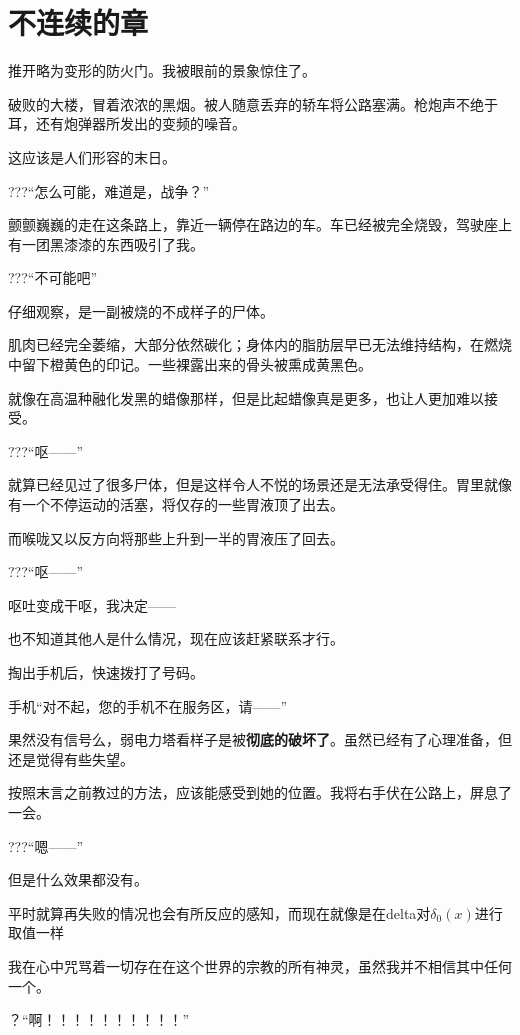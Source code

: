 \chapter[unknow chapter]{不连续的章}

推开略为变形的防火门。我被眼前的景象惊住了。

破败的大楼，冒着浓浓的黑烟。被人随意丢弃的轿车将公路塞满。枪炮声不绝于耳，还有炮弹器所发出的变频的噪音。

这应该是人们形容的末日。

???“怎么可能，难道是，战争？”

颤颤巍巍的走在这条路上，靠近一辆停在路边的车。车已经被完全烧毁，驾驶座上有一团黑漆漆的东西吸引了我。

???“不可能吧”

仔细观察，是一副被烧的不成样子的尸体。

肌肉已经完全萎缩，大部分依然碳化；身体内的脂肪层早已无法维持结构，在燃烧中留下橙黄色的印记。一些裸露出来的骨头被熏成黄黑色。

就像在高温种融化发黑的蜡像那样，但是比起蜡像真是更多，也让人更加难以接受。

???“呕——”

就算已经见过了很多尸体，但是这样令人不悦的场景还是无法承受得住。胃里就像有一个不停运动的活塞，将仅存的一些胃液顶了出去。

而喉咙又以反方向将那些上升到一半的胃液压了回去。

???“呕——”

呕吐变成干呕，我决定——


也不知道其他人是什么情况，现在应该赶紧联系才行。

掏出手机后，快速拨打了号码。

手机“对不起，您的手机不在服务区，请——”

果然没有信号么，弱电力塔看样子是被\textbf{彻底的破坏了}。虽然已经有了心理准备，但还是觉得有些失望。

按照末言之前教过的方法，应该能感受到她的位置。我将右手伏在公路上，屏息了一会。

???“嗯——”

但是什么效果都没有。

平时就算再失败的情况也会有所反应的感知，而现在就像是在delta对$ \delta _{0}(x)$进行取值一样

我在心中咒骂着一切存在在这个世界的宗教的所有神灵，虽然我并不相信其中任何一个。

？“啊！！！！！！！！！！”


